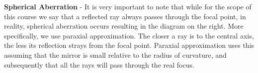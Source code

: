 \documentclass{article}
\begin{document}
\hspace{-15pt}\begin{minipage}{0.62\textwidth}
	\textbf{Spherical Aberration} - It is very important to note that while for the scope of this course we say that a reflected ray always passes through the focal point, in reality, spherical aberration occurs resulting in the diagram on the right. More specifically, we use paraxial approximation. The closer a ray is to the central axis, the less its reflection strays from the focal point. Paraxial approximation uses this assuming that the mirror is small relative to the radius of curvature, and subsequently that all the rays will pass through the real focus.
\end{minipage}
\begin{minipage}{0.2\textwidth}
	\vspace{-10pt}
	\hspace*{5pt}		

\end{minipage}
\vspace{20pt}
\end{document}
